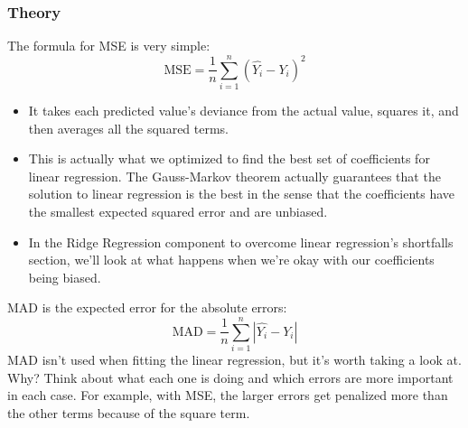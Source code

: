 \documentclass[SKL-MASTER.tex]{subfiles}
\begin{document}
	\subsubsection*{Theory}
	The formula for MSE is very simple:
	\[\mbox{MSE}=\frac{1}{n}\sum_{i=1}^n(\hat{Y_i} - Y_i)^2 \]
	
	\begin{itemize}
		\item	It takes each predicted value's deviance from the actual value, squares it, and then averages
		all the squared terms.
		\item  This is actually what we optimized to find the best set of coefficients for
		linear regression. The Gauss-Markov theorem actually guarantees that the solution to linear
		regression is the best in the sense that the coefficients have the smallest expected squared
		error and are unbiased. 
		\item In the Ridge Regression component to overcome linear regression's shortfalls
		section, we'll look at what happens when we're okay with our coefficients being biased.
	\end{itemize}
	
	MAD is the expected error for the absolute errors:
	\[ \mbox{MAD}=\frac{1}{n}\sum_{i=1}^n |\hat{Y_i} - Y_i| \]
	MAD isn't used when fitting the linear regression, but it's worth taking a look at. Why?
	Think about what each one is doing and which errors are more important in each case.
	For example, with MSE, the larger errors get penalized more than the other terms because
	of the square term.
	
\end{document}
